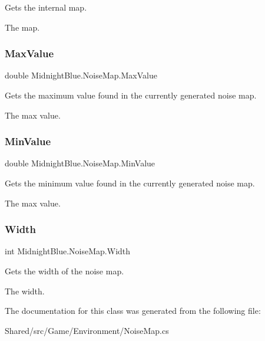 Gets the internal map. 

The map.\hypertarget{class_midnight_blue_1_1_noise_map_ac7a1a8a255b1512b1d09751b68636a32}{}\label{class_midnight_blue_1_1_noise_map_ac7a1a8a255b1512b1d09751b68636a32} 
\subsubsection{\texorpdfstring{Max\+Value}{MaxValue}}
{\footnotesize\ttfamily double Midnight\+Blue.\+Noise\+Map.\+Max\+Value\hspace{0.3cm}{\ttfamily [get]}}



Gets the maximum value found in the currently generated noise map. 

The max value.\hypertarget{class_midnight_blue_1_1_noise_map_a4b3978175deb42036e5a5e4f0ce5692e}{}\label{class_midnight_blue_1_1_noise_map_a4b3978175deb42036e5a5e4f0ce5692e} 
\subsubsection{\texorpdfstring{Min\+Value}{MinValue}}
{\footnotesize\ttfamily double Midnight\+Blue.\+Noise\+Map.\+Min\+Value\hspace{0.3cm}{\ttfamily [get]}}



Gets the minimum value found in the currently generated noise map. 

The max value.\hypertarget{class_midnight_blue_1_1_noise_map_a09a672256f9fb4c529e8052e428c18d2}{}\label{class_midnight_blue_1_1_noise_map_a09a672256f9fb4c529e8052e428c18d2} 
\subsubsection{\texorpdfstring{Width}{Width}}
{\footnotesize\ttfamily int Midnight\+Blue.\+Noise\+Map.\+Width\hspace{0.3cm}{\ttfamily [get]}}



Gets the width of the noise map. 

The width.

The documentation for this class was generated from the following file\+:\begin{DoxyCompactItemize}
\item 
Shared/src/\+Game/\+Environment/Noise\+Map.\+cs\end{DoxyCompactItemize}
